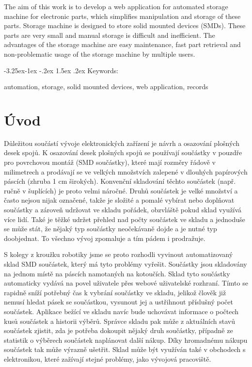 \documentclass[12pt, a4paper, oneside]{article}
\makeatletter
\renewcommand\paragraph{\@startsection{paragraph}{4}{\z@}%
      {-3.25ex\@plus -1ex \@minus -.2ex}%
      {1.5ex \@plus .2ex}%
      {\normalfont\normalsize\bfseries}}
\makeatother
\begin{document}
The aim of this work is to develop a web application for automated storage machine for electronic parts, which simplifies manipulation and storage of these parts. Storage machine is designed to store solid mounted devices (SMDs). These parts are very small and manual storage is difficult and inefficient. The advantages of the storage machine are easy maintenance, fast part retrieval and non-problematic usage of the storage machine by multiple users.

\paragraph{Keywords:}

automation, storage, solid mounted devices, web application, records

\newpage

\setcounter{page}{1}  %


\tableofcontents{}

\newpage

\pagestyle{plain}

\section*{Úvod}  %

Důležitou součástí vývoje elektronických zařízení je návrh a osazování plošných desek spojů. K osazování desek plošných spojů se používají součástky v pouzdře pro povrchovou montáž (SMD součástky), které mají rozměry řádově v milimetrech a prodávají se ve velkých množstvích zalepené v dlouhých papírových páscích (zhruba 1 cm širokých). Konvenční skladování těchto součástek (např. ručně v šuplících) je proto velmi náročné. Druhů součástek je velké množství a často nejsou nijak označené, takže je složité a pomalé vybírat nebo doplňovat součástky a zároveň udržovat ve skladu pořádek, obzvláště pokud sklad využívá více lidí. Také je těžké udržet přehled nad počty součástek ve skladu a jednoduše se může stát, že nějaký typ součástky neočekávaně dojde a je nutné typ doobjednat. To všechno vývoj zpomaluje a tím pádem i prodražuje.

S kolegy z kroužku robotiky jsme se proto rozhodli vyvinout automatizovaný sklad SMD součástek, který má tyto problémy vyřešit.
Součástky jsou skladovány na jednom místě na páscích namotaných na kotoučích. Sklad tyto součástky automaticky vydává na povel uživatele přes webové uživatelské rozhraní. Tímto se rapidně sníží potřebný čas k vybrání součástky ve skladu, jelikož člověk již nemusí hledat pásek se součástkou, vysunout jej a ustřihnout příslušný počet součástek.
Aplikace bežící ve skladu navíc bude uchovávat informace o počtech kusů součástek a historii výběrů. Správce skladu pak může z aktuálních stavů součástek zjistit, zda je potřeba dokoupit nějaký druh součástky, případně ze statistik o výběrech součástek naplánovat další nákup. Díky hromadnému nákupu součástek tak může výrazně ušetřit.
Sklad může být využíván také v obchodech s elektronikou, které zažívají stejné problémy, jako vývojová pracoviště.
\end{document}
